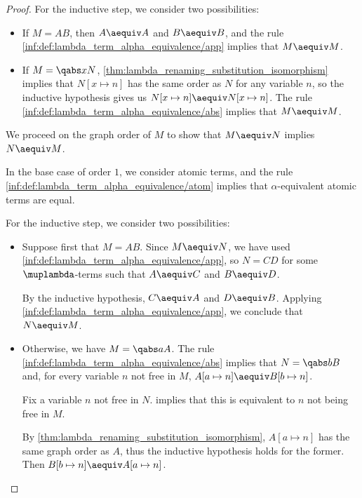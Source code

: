 \begin{proof}
  For the inductive step, we consider two possibilities:
  \begin{itemize}
    \item If \( M = AB \), then \( A \aequiv A \) and \( B \aequiv B \), and the rule \ref{inf:def:lambda_term_alpha_equivalence/app} implies that \( M \aequiv M \).

    \item If \( M = \qabs x N \), \cref{thm:lambda_renaming_substitution_isomorphism} implies that \( N[x \mapsto n] \) has the same order as \( N \) for any variable \( n \), so the inductive hypothesis gives us \( N[x \mapsto n] \aequiv N[x \mapsto n] \). The rule \ref{inf:def:lambda_term_alpha_equivalence/abs} implies that \( M \aequiv M \).
  \end{itemize}

   We proceed on the graph order of \( M \) to show that \( M \aequiv N \) implies \( N \aequiv M \).

  In the base case of order \( 1 \), we consider atomic terms, and the rule \ref{inf:def:lambda_term_alpha_equivalence/atom} implies that \( \alpha \)-equivalent atomic terms are equal.

  For the inductive step, we consider two possibilities:
  \begin{itemize}
    \item Suppose first that \( M = AB \). Since \( M \aequiv N \), we have used \ref{inf:def:lambda_term_alpha_equivalence/app}, so \( N = CD \) for some \( \muplambda \)-terms such that \( A \aequiv C \) and \( B \aequiv D \).

    By the inductive hypothesis, \( C \aequiv A \) and \( D \aequiv B \). Applying \ref{inf:def:lambda_term_alpha_equivalence/app}, we conclude that \( N \aequiv M \).

    \item Otherwise, we have \( M = \qabs a A \). The rule \ref{inf:def:lambda_term_alpha_equivalence/abs} implies that \( N = \qabs b B \) and, for every variable \( n \) not free in \( M \), \( A[a \mapsto n] \aequiv B[b \mapsto n] \).

    Fix a variable \( n \) not free in \( N \).  implies that this is equivalent to \( n \) not being free in \( M \).

    By \cref{thm:lambda_renaming_substitution_isomorphism}, \( A[a \mapsto n] \) has the same graph order as \( A \), thus the inductive hypothesis holds for the former. Then \( B[b \mapsto n] \aequiv A[a \mapsto n] \).


\end{itemize}
\end{proof}
